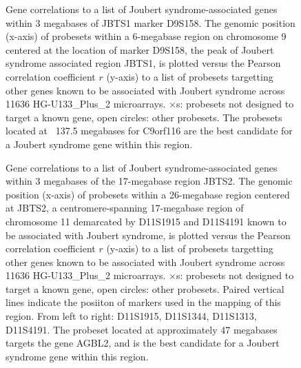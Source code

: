 \documentclass{bioinfo}
\begin{document}
\begin{figure}[!tpb]
\label{figure:JBTS1}
\centerline{}
\caption{Gene correlations to a list of Joubert syndrome-associated genes within 3
megabases of JBTS1 marker D9S158.  The genomic position (x-axis) of probesets
within a 6-megabase region on chromosome 9 centered at the location of marker D9S158, the peak
of Joubert syndrome associated region JBTS1, is plotted versus the Pearson
correlation coefficient $r$ (y-axis) to a list of probesets targetting other
genes known to be associated with Joubert syndrome across 11636
HG-U133\_Plus\_2 microarrays.  $\times$s: probesets not designed to target a
known gene, open circles: other probesets.  The probesets located at ~137.5
megabases for C9orf116 are the best candidate for a Joubert syndrome gene
within this region.}
\end{figure}


\begin{figure}[!tpb]
\label{figure:JBTS2}
\centerline{}
\caption{Gene correlations to a list of Joubert syndrome-associated genes within 3
megabases of the 17-megabase region JBTS2.  The genomic position (x-axis) of
probesets within a 26-megabase region centered at JBTS2, a centromere-spanning
17-megabase region of chromosome 11 demarcated by D11S1915 and D11S4191 known
to be associated with Joubert syndrome, is plotted versus the Pearson
correlation coefficient $r$ (y-axis) to a list of probesets targetting other
genes known to be associated with Joubert syndrome across 11636
HG-U133\_Plus\_2 microarrays.  $\times$s: probesets not designed to target a
known gene, open circles: other probesets.  Paired vertical lines indicate the
posiiton of markers used in the mapping of this region.  From left to right:
D11S1915, D11S1344, D11S1313, D11S4191.  The probeset located at approximately
47 megabases targets the gene AGBL2, and is the best candidate for a Joubert
syndrome gene within this region.}
\end{figure}
\end{document}

